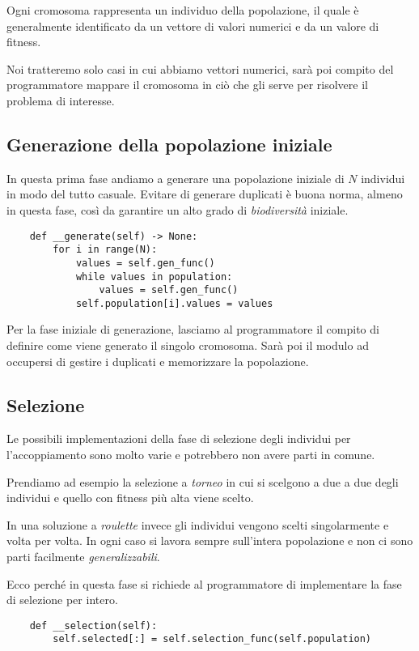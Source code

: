 Ogni cromosoma rappresenta un individuo della popolazione, il quale è
generalmente identificato da un vettore di valori numerici e da un valore di
fitness.

Noi tratteremo solo casi in cui abbiamo vettori numerici, sarà poi compito del
programmatore mappare il cromosoma in ciò che gli serve per risolvere il
problema di interesse.

\subsection{Generazione della popolazione iniziale}

In questa prima fase andiamo a generare una popolazione iniziale di $N$
individui in modo del tutto casuale. Evitare di generare duplicati è buona
norma, almeno in questa fase, così da garantire un alto grado di
\emph{biodiversità} iniziale.

\begin{verbatim}
	def __generate(self) -> None:
		for i in range(N):
			values = self.gen_func()
			while values in population:
				values = self.gen_func()
			self.population[i].values = values
\end{verbatim}

Per la fase iniziale di generazione, lasciamo al programmatore il compito di
definire come viene generato il singolo cromosoma. Sarà poi il modulo ad
occupersi di gestire i duplicati e memorizzare la popolazione.

\subsection{Selezione}

Le possibili implementazioni della fase di selezione degli individui per
l'accoppiamento sono molto varie e potrebbero non avere parti in comune.

Prendiamo ad esempio la selezione a \emph{torneo} in cui si scelgono a due a
due degli individui e quello con fitness più alta viene scelto.

In una soluzione a \emph{roulette} invece gli individui vengono scelti
singolarmente e volta per volta. In ogni caso si lavora sempre sull'intera
popolazione e non ci sono parti facilmente \emph{generalizzabili}.

Ecco perché in questa fase si richiede al programmatore di implementare la fase
di selezione per intero.

\begin{verbatim}
	def __selection(self):
		self.selected[:] = self.selection_func(self.population)
\end{verbatim}

